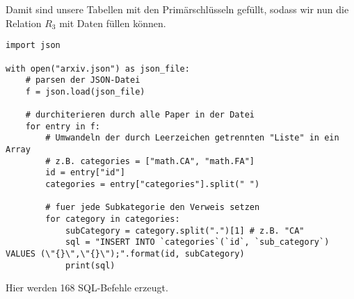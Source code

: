 \documentclass{article}
\begin{document}
	Damit sind unsere Tabellen mit den Primärschlüsseln gefüllt, sodass wir nun die Relation $R_3$ mit Daten füllen können.
	\begin{lstlisting}[style=python,tabsize=2]
import json

with open("arxiv.json") as json_file:
	# parsen der JSON-Datei
	f = json.load(json_file)

	# durchiterieren durch alle Paper in der Datei
	for entry in f:
		# Umwandeln der durch Leerzeichen getrennten "Liste" in ein Array
		# z.B. categories = ["math.CA", "math.FA"]
		id = entry["id"]
		categories = entry["categories"].split(" ")

		# fuer jede Subkategorie den Verweis setzen
		for category in categories:
			subCategory = category.split(".")[1] # z.B. "CA"
			sql = "INSERT INTO `categories`(`id`, `sub_category`) VALUES (\"{}\",\"{}\");".format(id, subCategory)
			print(sql)
	\end{lstlisting}
	Hier werden 168 SQL-Befehle erzeugt.
	
\end{document}
